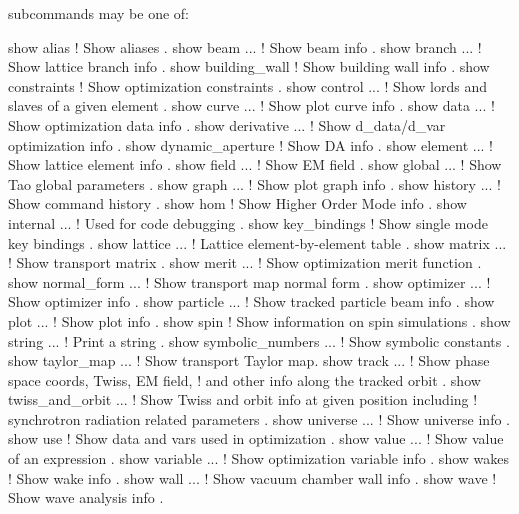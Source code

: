 {{{{{{{ subcommands may be one of:
\begin{example}
  show alias                 ! Show aliases .
  show beam ...              ! Show beam info .
  show branch ...            ! Show lattice branch info .
  show building_wall         ! Show building wall info .
  show constraints           ! Show optimization constraints .
  show control ...           ! Show lords and slaves of a given element .
  show curve ...             ! Show plot curve info .
  show data ...              ! Show optimization data info .
  show derivative ...        ! Show d_data/d_var optimization info .
  show dynamic_aperture      ! Show DA info .
  show element ...           ! Show lattice element info .
  show field ...             ! Show EM field .
  show global ...            ! Show Tao global parameters .
  show graph ...             ! Show plot graph info .
  show history ...           ! Show command history .
  show hom                   ! Show Higher Order Mode info .
  show internal ...          ! Used for code debugging .
  show key_bindings          ! Show single mode key bindings .
  show lattice ...           ! Lattice element-by-element table .
  show matrix ...            ! Show transport matrix .
  show merit ...             ! Show optimization merit function .
  show normal_form ...       ! Show transport map normal form .
  show optimizer ...         ! Show optimizer info .
  show particle ...          ! Show tracked particle beam info .
  show plot ...              ! Show plot info .
  show spin                  ! Show information on spin simulations .
  show string ...            ! Print a string .
  show symbolic_numbers ...  ! Show symbolic constants .
  show taylor_map ...        ! Show transport Taylor map.
  show track ...             ! Show phase space coords, Twiss, EM field, 
                             !   and other info along the tracked orbit .
  show twiss_and_orbit ...   ! Show Twiss and orbit info at given position including
                             !   synchrotron radiation related parameters .
  show universe ...          ! Show universe info .
  show use                   ! Show data and vars used in optimization .
  show value ...             ! Show value of an expression .
  show variable ...          ! Show optimization variable info .
  show wakes                 ! Show wake info .
  show wall ...              ! Show vacuum chamber wall info .
  show wave                  ! Show wave analysis info .
\end{example}

}}}}}}}
